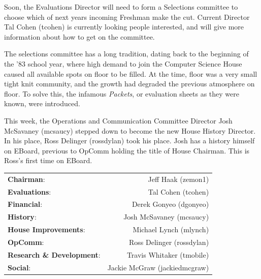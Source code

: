 \documentclass[10pt]{article} %
\begin{document}
\begin{minipage}[t]{.66\linewidth} %
\vspace{-0.4cm}
\hypertarget{firstnews}{} %
	
Soon, the Evaluations Director will need to form a Selections committee to choose which of next years incoming Freshman make the cut. Current Director Tal Cohen (tcohen) is currently looking people interested, and will give more information about how to get on the committee.

The selections committee has a long tradition, dating back to the beginning of the '83 school year, where high demand to join the Computer Science House caused all available spots on floor to be filled. At the time, floor was a very small tight knit community, and the growth had degraded the previous atmosphere on floor. To solve this, the infamous \textit{Packets}, or evaluation sheets as they were known, were introduced.


\hypertarget{secondnews}{} %

This week, the Operations and Communication Committee Director Josh McSavaney (mcsaucy) stepped down to become the new House History Director. In his place, Ross Delinger (rossdylan) took his place. Josh has a history himself on EBoard, previous to OpComm holding the title of House Chairman. This is Ross's first time on EBoard.

\begin{tabular}{lr}
\textbf{Chairman}: & Jeff Haak (zemon1) \\
\textbf{Evaluations}: & Tal Cohen (tcohen) \\
\textbf{Financial}: & Derek Gonyeo (dgonyeo) \\
\textbf{History}: & Josh McSavaney (mcsaucy) \\
\textbf{House Improvements}: & Michael Lynch (mlynch) \\
\textbf{OpComm}: & Ross Delinger (rossdylan) \\
\textbf{Research \& Development}: & Travis Whitaker (tmobile) \\
\textbf{Social}: & Jackie McGraw (jackiedmcgraw) \\
\end{tabular}


\end{minipage}
\end{document}
